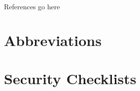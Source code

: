 \documentclass[a4paper]{report}
\newif\ifstructure
\begin{document}
	\ifstructure
		
	\else
		
	\fi
	
	\clearpage
	
	References go here
	
	\appendix
	\chapter{Abbreviations}
	\label{abbreviations}
	
	\ifstructure
	\else 
	
	\fi
	
	\chapter{Security Checklists}
	\label{security-appendix}
	
	\ifstructure
	\else 
		
	\fi
\end{document}
